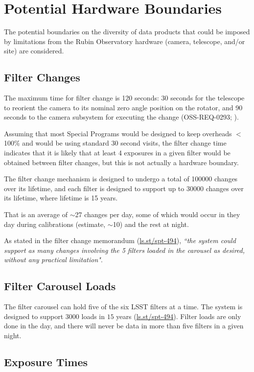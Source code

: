 \section{Potential Hardware Boundaries}\label{sec:hardbounds}

The potential boundaries on the diversity of data products that could be imposed by 
limitations from the Rubin Observatory hardware (camera, telescope, and/or site) 
are considered.

\subsection{Filter Changes}

The maximum time for filter change is 120 seconds: 30 seconds for the telescope to 
reorient the camera to its nominal zero angle position on the rotator, and 90 seconds to 
the camera subsystem for executing the change (OSS-REQ-0293; ).

Assuming that most Special Programs would be designed to keep overheads $<$100\% and would 
be using standard 30 second visits, the filter change time indicates that it is likely 
that at least 4 exposures in a given filter would be obtained between filter changes, but 
this is not actually a hardware boundary.

The filter change mechanism is designed to undergo a total of 100000 changes over its 
lifetime, and each filter is designed to support up to 30000 changes over its lifetime, 
where lifetime is 15 years.

That is an average of $\sim$27 changes per day, some of which would occur in they day 
during calibrations (estimate, $\sim$10) and the rest at night.

As stated in the filter change memorandum (\url{ls.st/spt-494}), {\it ``the system could 
support as many changes involving the 5 filters loaded in the carousel as desired, without 
any practical limitation"}.

\subsection{Filter Carousel Loads}

The filter carousel can hold five of the six LSST filters at a time. 
The system is designed to support $3000$ loads in $15$ years (\url{ls.st/spt-494}). 
Filter loads are only done in the day, and there will never be data in more than five 
filters in a given night.

\subsection{Exposure Times}


